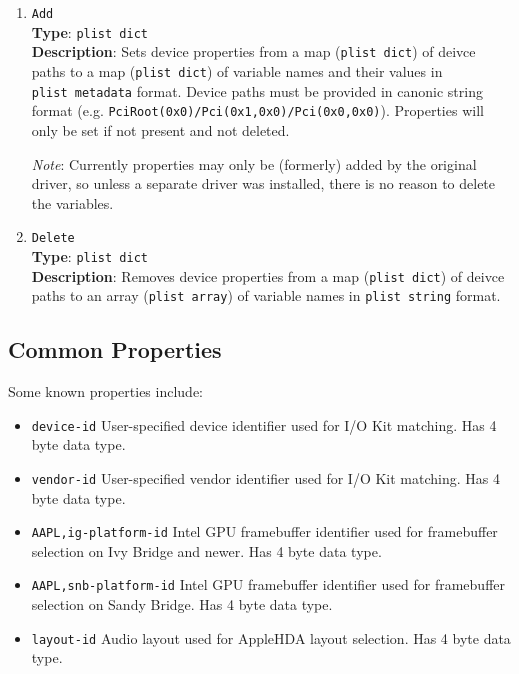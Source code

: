 \documentclass[]{article}
\providecommand{\tightlist}{%
  \setlength{\itemsep}{0pt}\setlength{\parskip}{0pt}}
\begin{document}
\begin{enumerate}
\item
  \texttt{Add}\\
  \textbf{Type}: \texttt{plist\ dict}\\
  \textbf{Description}: Sets device properties from a map (\texttt{plist\ dict})
  of deivce paths to a map (\texttt{plist\ dict}) of variable names and their values
  in \texttt{plist\ metadata} format. Device paths must be provided in canonic string
  format (e.g. \texttt{PciRoot(0x0)/Pci(0x1,0x0)/Pci(0x0,0x0)}). Properties will only
  be set if not present and not deleted.

  \emph{Note}: Currently properties may only be (formerly) added by the original driver,
  so unless a separate driver was installed, there is no reason to delete the variables.

\item
  \texttt{Delete}\\
  \textbf{Type}: \texttt{plist\ dict}\\
  \textbf{Description}: Removes device properties from a map (\texttt{plist\ dict})
  of deivce paths to an array (\texttt{plist\ array}) of variable names in
  \texttt{plist\ string} format.

\end{enumerate}

\subsection{Common Properties}\label{devpropscommon}

Some known properties include:

\begin{itemize}
\tightlist
\item
  \texttt{device-id}
  \break
  User-specified device identifier used for I/O Kit matching. Has 4 byte data type.
\item
  \texttt{vendor-id}
  \break
  User-specified vendor identifier used for I/O Kit matching. Has 4 byte data type.
\item
  \texttt{AAPL,ig-platform-id}
  \break
  Intel GPU framebuffer identifier used for framebuffer selection on Ivy Bridge and newer.
  Has 4 byte data type.
\item
  \texttt{AAPL,snb-platform-id}
  \break
  Intel GPU framebuffer identifier used for framebuffer selection on Sandy Bridge.
  Has 4 byte data type.
\item
  \texttt{layout-id}
  \break
  Audio layout used for AppleHDA layout selection. Has 4 byte data type.
\end{itemize}
\end{document}
